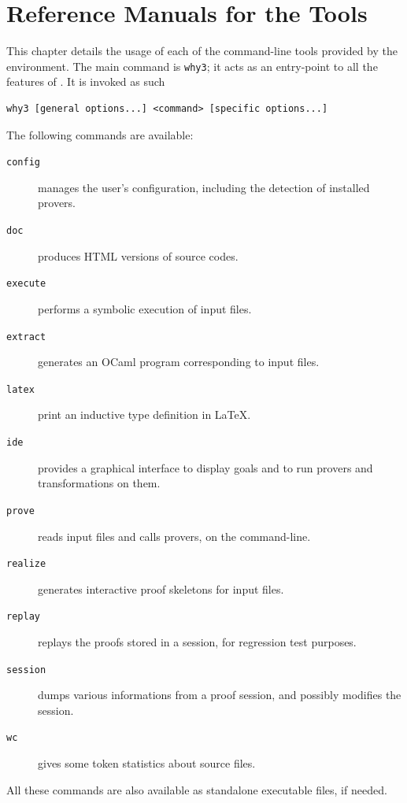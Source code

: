 \chapter{Reference Manuals for the \why Tools}
\label{chap:manpages}

This chapter details the usage of each of the command-line tools
provided by the \why environment. The main command is \texttt{why3};
it acts as an entry-point to all the features of \why. It is invoked
as such
\begin{verbatim}
why3 [general options...] <command> [specific options...]
\end{verbatim}

The following commands are available:
\begin{description}
\item[\texttt{config}] manages the user's configuration,
  including the detection of installed provers.
\item[\texttt{doc}] produces HTML versions of \why source codes.
\item[\texttt{execute}] performs a symbolic execution of \whyml
  input files.
\item[\texttt{extract}] generates an OCaml program corresponding to
  \whyml input files.
\item[\texttt{latex}] print an inductive type definition in LaTeX.
\item[\texttt{ide}] provides a graphical interface to display goals
  and to run provers and transformations on them.
\item[\texttt{prove}] reads \whyml input files and calls
  provers, on the command-line.
\item[\texttt{realize}] generates interactive proof skeletons for
  \why input files.
\item[\texttt{replay}] replays the proofs stored in a session,
  for regression test purposes.
\item[\texttt{session}] dumps various informations from a proof
  session, and possibly modifies the session.
\item[\texttt{wc}] gives some token statistics about \whyml
  source files.
\end{description}

All these commands are also available as standalone executable files,
if needed.

